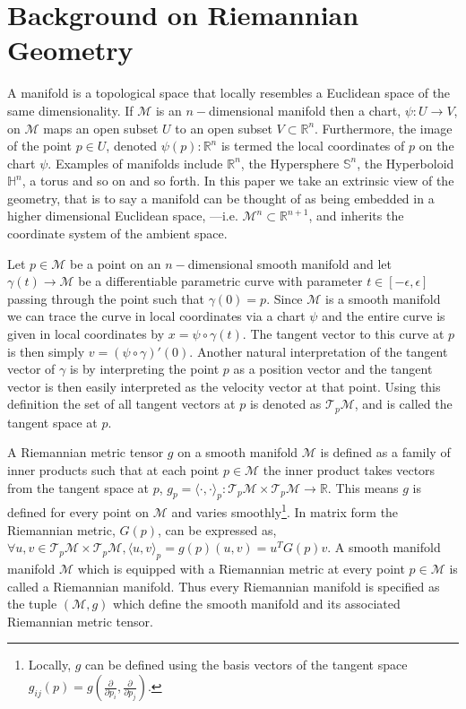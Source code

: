 \appendix
\onecolumn
\section{Background on Riemannian Geometry}
\label{riemannian_geometry_appendix}
A manifold is a topological space that locally resembles a Euclidean space of the same dimensionality. If $\mathcal{M}$ is an $n-$dimensional manifold then a chart, $\psi: U \to V$, on $\mathcal{M}$ maps an open subset $U$ to an open subset $V \subset \mathbb{R}^n$. Furthermore, the image of the point $p \in U$, denoted $\psi(p) : \mathbb{R}^n$ is termed the local coordinates of $p$ on the chart $\psi$. Examples of manifolds include $\mathbb{R}^n$, the Hypersphere $\mathbb{S}^n$, the Hyperboloid $\mathbb{H}^n$, a torus and so on and so forth. In this paper we take an extrinsic view of the geometry, that is to say a manifold can be thought of as being embedded in a higher dimensional Euclidean space, ---i.e. $\mathcal{M}^n \subset \mathbb{R}^{n+1}$, and inherits the coordinate system of the ambient space. 

 Let $p \in \mathcal{M}$ be a point on an $n-$dimensional smooth manifold and let $\gamma(t) \to \mathcal{M}$ be a differentiable parametric curve with parameter $t \in [-\epsilon, \epsilon]$ passing through the point such that $\gamma(0) = p$. Since $\mathcal{M}$ is a smooth manifold we can trace the curve in local coordinates via a chart $\psi$ and the entire curve is given in local coordinates by $x = \psi \circ \gamma(t)$. The tangent vector to this curve at $p$ is then simply $v = (\psi \circ \gamma)'(0)$. Another natural interpretation of the tangent vector of $\gamma$ is by interpreting the point $p$ as a position vector and the tangent vector is then easily interpreted as the velocity vector at that point. Using this definition the set of all tangent vectors at $p$ is denoted as $\mathcal{T}_p{\mathcal{M}}$, and is called the tangent space at $p$. 

A Riemannian metric tensor $g$ on a smooth manifold $\mathcal{M}$ is defined as a family of inner products such that at each point $p \in \mathcal{M}$ the inner product takes vectors from the tangent space at $p$, $g_p= \langle \cdot, \cdot \rangle_p: \mathcal{T}_p\mathcal{M} \times \mathcal{T}_p\mathcal{M} \to \mathbb{R}$. This means $g$ is defined for every point on $\mathcal{M}$ and varies smoothly\footnote{Locally, $g$ can be defined using the basis vectors of the tangent space $g_{ij}(p) = g(\frac{\partial}{\partial p_i}, \frac{\partial}{\partial p_j})$.}. In matrix form the Riemannian metric, $G(p)$, can be expressed as, $\forall u,v \in  \mathcal{T}_p\mathcal{M} \times \mathcal{T}_p\mathcal{M}, \langle u, v \rangle_p = g(p)(u,v) = u^T G(p) v$. A smooth manifold manifold $\mathcal{M}$ which is equipped with a Riemannian metric at every point $p \in \mathcal{M}$ is called a Riemannian manifold. Thus every Riemannian manifold is specified as the tuple $(\mathcal{M},g)$ which define the smooth manifold and its associated Riemannian metric tensor.

